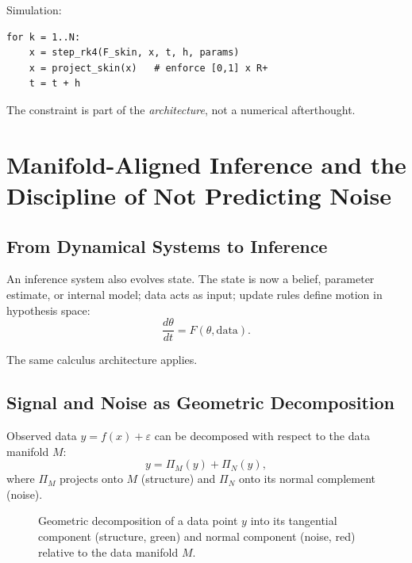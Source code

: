 \documentclass[12pt,openany]{book}
\newcommand{\proj}[1]{\Pi_{#1}}
\begin{document}
Simulation:
\begin{lstlisting}
for k = 1..N:
    x = step_rk4(F_skin, x, t, h, params)
    x = project_skin(x)   # enforce [0,1] x R+
    t = t + h
\end{lstlisting}

The constraint is part of the \emph{architecture}, not a numerical afterthought.

\chapter{Manifold-Aligned Inference and the Discipline of Not Predicting Noise}
\label{ch:inference}

\section{From Dynamical Systems to Inference}

An inference system also evolves state. The state is now a belief, parameter
estimate, or internal model; data acts as input; update rules define motion in
hypothesis space:
\[
  \frac{d\theta}{dt} = F(\theta, \text{data}).
\]

The same calculus architecture applies.

\section{Signal and Noise as Geometric Decomposition}

Observed data $y=f(x)+\varepsilon$ can be decomposed with respect to the data
manifold $M$:
\[
  y = \proj{M}(y) + \proj{N}(y),
\]
where $\proj{M}$ projects onto $M$ (structure) and $\proj{N}$ onto its normal
complement (noise).

\begin{figure}[H]
\centering
{}
\caption{Geometric decomposition of a data point $y$ into its tangential
component (structure, green) and normal component (noise, red) relative to the
data manifold $M$.}
\label{fig:noise-proj}
\end{figure}
\end{document}
